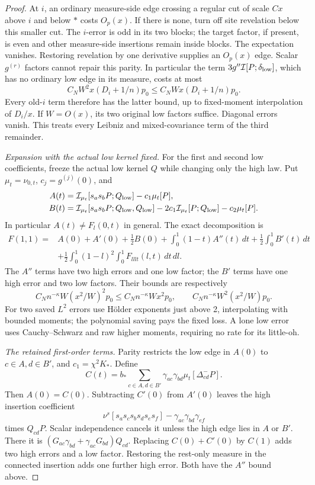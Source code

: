 \begin{proof}
At \(i\), an ordinary measure-side edge crossing a
regular cut of scale \(Cx\) above \(i\) and below
\(*\) costs \(O_p(x)\). If there is none, turn off
site revelation below this smaller cut. The
\(i\)-error is odd in its two blocks; the target
factor, if present, is even and other measure-side
insertions remain inside blocks. The expectation
vanishes. Restoring revelation by one derivative
supplies an \(O_p(x)\) edge. Scalar \(g^{(r)}\)
factors cannot repair this parity. In particular
the term \(3g''\mathcal I[P;\delta_{\rm low}]\),
which has no ordinary low edge in its measure,
costs at most
\[
 C_NW^2x(D_i+1/n)p_0\le C_NWx(D_i+1/n)p_0.
\]
Every old-\(i\) term therefore has the latter bound,
up to fixed-moment interpolation of \(D_i/x\).
If \(W=O(x)\), its two original low factors suffice.
Diagonal errors vanish. This treats every Leibniz
and mixed-covariance term of the third remainder.

\emph{Expansion with the actual low kernel fixed.}
For the first and second low coefficients, freeze
the actual low kernel \(Q\) while changing only the
high law. Put \(\mu_t=\nu_{0,t}\), \(c_j=g^{(j)}(0)\),
and
\[
 \begin{split}
 A(t)&=\mathcal I_{\mu_t}[s_as_bP;Q_{\rm low}]
                                              -c_1\mu_t[P],\\
 B(t)&=\mathcal I_{\mu_t}[s_as_bP;Q_{\rm low},Q_{\rm low}]
       -2c_1\mathcal I_{\mu_t}[P;Q_{\rm low}]-c_2\mu_t[P].
 \end{split}
\]
In particular \(A(t)\ne F_l(0,t)\) in general.
The exact decomposition is
\[
 \begin{split}
 F(1,1)={}&A(0)+A'(0)+\tfrac12B(0)
       +\int_0^1(1-t)A''(t)\,dt
       +\tfrac12\int_0^1B'(t)\,dt\\
 &+\frac12\int_0^1(1-l)^2\int_0^1F_{lllt}(l,t)\,dt\,dl .
 \end{split}
\]
The \(A''\) terms have two high errors and one low
factor; the \(B'\) terms have one high error and
two low factors. Their bounds are respectively
\[
 C_Nn^{-\kappa}W(x^2/W)^2p_0
       \le C_Nn^{-\kappa}Wx^2p_0,\qquad
 C_Nn^{-\kappa}W^2(x^2/W)p_0.
\]
For two saved \(L^2\) errors use H\"older exponents
just above 2, interpolating with bounded moments;
the polynomial saving pays the fixed loss.
A lone low error uses Cauchy--Schwarz and raw
higher moments, requiring no rate for its little-oh.

\emph{The retained first-order terms.}
Parity restricts the low edge in \(A(0)\) to
\(c\in A,d\in B'\), and \(c_1=\chi^2K_*\).
Define
\[
 C(t)=b_*\sum_{c\in A,d\in B'}\gamma_{ac}\gamma_{bd}
                                      \mu_t[\Delta^-_{cd}P].
\]
Then \(A(0)=C(0)\). Subtracting \(C'(0)\) from
\(A'(0)\) leaves the high insertion coefficient
\[
 \nu^s[s_as_cs_bs_ds_es_f]
                         -\gamma_{ac}\gamma_{bd}\gamma_{ef}
\]
times \(Q_{cd}P\). Scalar independence cancels it
unless the high edge lies in \(A\) or \(B'\).
There it is
\((G_{ac}\gamma_{bd}+\gamma_{ac}G_{bd})Q_{cd}\).
Replacing \(C(0)+C'(0)\) by \(C(1)\) adds two
high errors and a low factor. Restoring the
rest-only measure in the connected insertion
adds one further high error. Both have the
\(A''\) bound above.


\end{proof}
